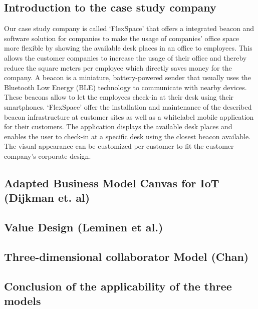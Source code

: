 	\subsection{Introduction to the case study company}
	Our case study company is called `FlexSpace' that offers a integrated beacon and software solution for companies to make the usage of companies' office space more flexible by showing the available desk places in an office to employees. This allows the customer companies to increase the usage of their office and thereby reduce the square meters per employee which directly saves money for the company. A beacon is a miniature, battery-powered sender that usually uses the Bluetooth Low Energy (BLE) technology to communicate with nearby devices. These beacons allow to let the employees check-in at their desk using their smartphones. `FlexSpace' offer the installation and maintenance of the described beacon infrastructure at customer sites as well as a whitelabel mobile application for their customers. The application displays the available desk places and enables the user to check-in at a specific desk using the closest beacon available. The visual appearance can be customized per customer to fit the customer company's corporate design.


	\subsection{Adapted Business Model Canvas for IoT (Dijkman et. al)}

	\subsection{Value Design (Leminen et al.)}

	\subsection{Three-dimensional collaborator Model (Chan)	}		

	\subsection{Conclusion of the applicability of the three models}

